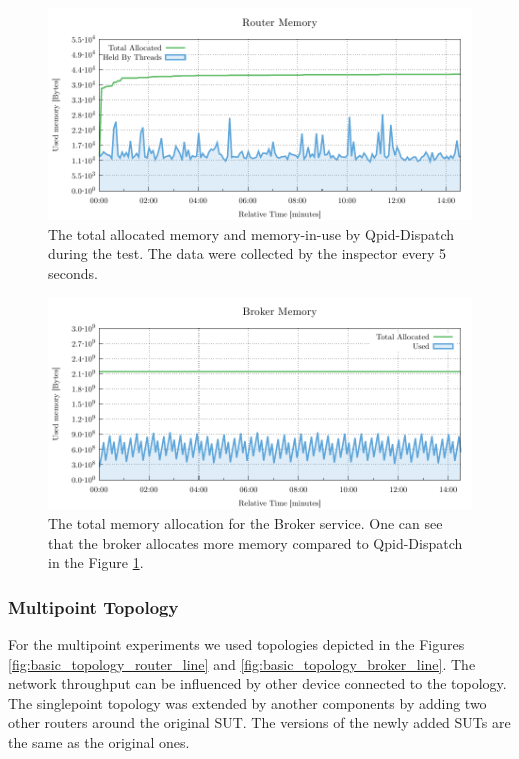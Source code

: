 \begin{figure}[H]
	\centering
	\includegraphics[width=1\linewidth]{obrazky-figures/charts/singlepoint-router-throughput-memory.pdf}
	\caption{The total allocated memory and memory-in-use by Qpid-Dispatch during the test. The data were collected by the inspector every 5\,seconds.}
	\label{fig:router-single-memory}
\end{figure}

\begin{figure}[H]
	\centering
	\includegraphics[width=1\linewidth]{obrazky-figures/charts/singlepoint-broker-throughput-memory.pdf}
	\caption{The total memory allocation for the Broker service. One can see that the broker allocates more memory compared to Qpid-Dispatch in the Figure \ref{fig:router-single-memory}.}
	\label{fig:broker-single-memory}
\end{figure}


\subsubsection*{Multipoint Topology}
For the multipoint experiments we used topologies depicted in the Figures \ref{fig:basic_topology_router_line} and \ref{fig:basic_topology_broker_line}. The network throughput can be influenced by other device connected to the topology. The singlepoint topology was extended by another components by adding two other routers around the original SUT. The versions of the newly added SUTs are the same as the original ones.

